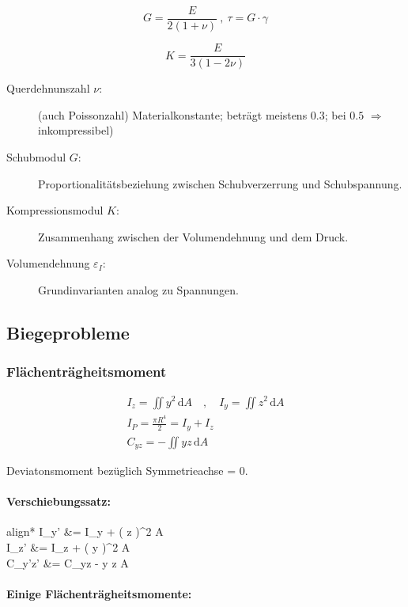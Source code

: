 \documentclass{article}
\newcommand{\ud}{\,\mathrm{d}}
\begin{document}
\begin{multicols*}{4}
				\[
					G = \frac{E}{2(1+\nu)}\ ,\ \tau = G \cdot \gamma
				\]
				
				\[
					K = \frac{E}{3(1-2\nu)}
				\]
				
				\begin{description}
					\item[Querdehnunszahl $\nu$:] (auch Poissonzahl) Materialkonstante; beträgt meistens $0.3$; bei $0.5$ $\Rightarrow$ inkompressibel)
					\item[Schubmodul $G$:] Proportionalitätsbeziehung zwischen Schubverzerrung und Schubspannung.
					\item[Kompressionsmodul $K$:] Zusammenhang zwischen der Volumendehnung und dem Druck. 
					\item[Volumendehnung $\varepsilon_I$:] Grundinvarianten analog zu Spannungen.
				\end{description}
			\subsection{Biegeprobleme} %
				\subsubsection{Flächenträgheitsmoment} %
					\begin{gather*}
						I_z = \iint y^2 \ud A
						\quad,\quad
						I_y = \iint z^2 \ud A
						\\
						I_P = \frac{\pi R^4}{2} = I_y + I_z
						\\
						C_{yz} = - \iint yz \ud A
					\end{gather*}
					
					Deviatonsmoment bezüglich Symmetrieachse = 0.
					
					\paragraph{Verschiebungssatz:} %
						\begin{empheq}[box=\shadowbox]{align*}
							I_{y'} &= I_y + ( \Delta z )^2 \cdot A \\
							I_{z'} &= I_z + ( \Delta y )^2 \cdot A \\
							C_{y'z'} &= C_{yz} - \Delta y \Delta z \cdot A
						\end{empheq}
					\paragraph{Einige Flächenträgheitsmomente:} %
						

\end{multicols*}
\end{document}
